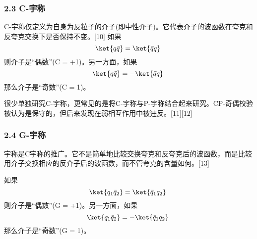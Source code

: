 \subsubsection{2.3 C-宇称}
C-宇称仅定义为自身为反粒子的介子(即中性介子)。它代表介子的波函数在夸克和反夸克交换下是否保持不变。[10] 如果\begin{equation}
\ket{q\bar q}=\ket{\bar q q}~
\end{equation}
则介子是“偶数”(C = +1)。另一方面，如果\begin{equation}
\ket{q\bar q}=-\ket{\bar q q}~
\end{equation}
那么介子是“奇数”(C = 1)。

很少单独研究C-宇称，更常见的是将C-宇称与P-宇称结合起来研究。CP-奇偶校验被认为是保守的，但后来发现在弱相互作用中被违反。[11][12]

\subsubsection{2.4 G-宇称}
宇称是C宇称的推广。它不是简单地比较交换夸克和反夸克后的波函数，而是比较用介子交换相应的反介子后的波函数，而不管夸克的含量如何。[13]

如果\begin{equation}
\ket{q_1\bar q_2}=\ket{\bar q_1q_2}~
\end{equation}
则介子是“偶数”(G = +1)。另一方面，如果
\begin{equation}
\ket{q_1\bar q_2}=-\ket{\bar q_1q_2}~
\end{equation}
那么介子是“奇数”(G = 1)。

